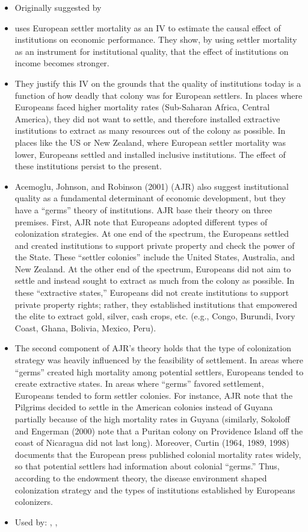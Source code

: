 \begin{itemize}
    \item Originally suggested by \citet{ajr}
    \item \citet{ajr} uses European settler mortality as an IV to estimate the causal effect of institutions on economic performance. They show, by using settler mortality as an instrument for institutional quality, that the effect of institutions on income becomes stronger.
    \item They justify this IV on the grounds that the quality of institutions today is a function of how deadly that colony was for European settlers. In places where Europeans faced higher mortality rates (Sub-Saharan Africa, Central America), they did not want to settle, and therefore installed extractive institutions to extract as many resources out of the colony as possible. In places like the US or New Zealand, where European settler mortality was lower, Europeans settled and installed inclusive institutions. The effect of these institutions persist to the present. 
    \item Acemoglu, Johnson, and Robinson (2001) (AJR) also suggest institutional quality as a fundamental determinant of economic development, but they have a “germs” theory of institutions. AJR base their theory on three premises. First, AJR note that Europeans adopted different types of colonization strategies. At one end of the spectrum, the Europeans settled and created institutions to support private property and check the power of the State. These “settler colonies” include the United States, Australia, and New Zealand. At the other end of the spectrum, Europeans did not aim to settle and instead sought to extract as much from the colony as possible. In these “extractive states,” Europeans did not create institutions to support private property rights; rather, they established institutions that empowered the elite to extract gold, silver, cash crops, etc. (e.g., Congo, Burundi, Ivory Coast, Ghana, Bolivia, Mexico, Peru).
    \item The second component of AJR’s theory holds that the type of colonization strategy was heavily influenced by the feasibility of settlement. In areas where “germs” created high mortality among potential settlers, Europeans tended to create extractive states. In areas where “germs” favored settlement, Europeans tended to form settler colonies. For instance, AJR note that the Pilgrims decided to settle in the American colonies instead of Guyana partially because of the high mortality rates in Guyana (similarly, Sokoloff and Engerman (2000) note that a Puritan colony on Providence Island off the coast of Nicaragua did not last long). Moreover, Curtin (1964, 1989, 1998) documents that the European press published colonial mortality rates widely, so that potential settlers had information about colonial “germs.” Thus, according to the endowment theory, the disease environment shaped colonization strategy and the types of institutions established by Europeans colonizers.
    \item Used by:  \citet{rodrik2004institutions}, \citet{boschini2004resource}, \citet{dollar}
\end{itemize}

